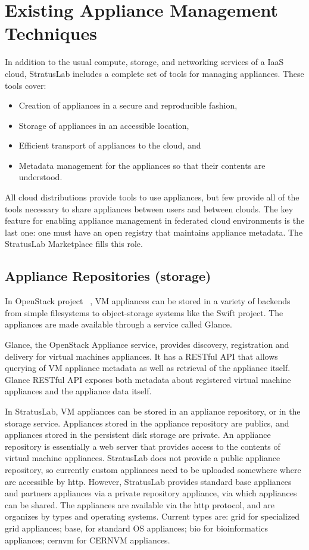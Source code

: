 \section{Existing Appliance Management Techniques}
\label{sec:other-approaches}

In addition to the usual compute, storage, and networking services of
a IaaS cloud, StratusLab includes a complete set of tools for managing
appliances.  These tools cover:
\begin{itemize}
\item Creation of appliances in a secure and reproducible fashion,
\item Storage of appliances in an accessible location,
\item Efficient transport of appliances to the cloud,
  and
\item Metadata management for the appliances so that their contents
  are understood.
\end{itemize}
All cloud distributions provide tools to use appliances, but few
provide all of the tools necessary to share appliances between users
and between clouds.  The key feature for enabling appliance management
in federated cloud environments is the last one: one must have an open
registry that maintains appliance metadata.  The StratusLab
Marketplace fills this role.

\subsection{Appliance Repositories (storage)}

In OpenStack project ~\cite{openstack}, VM appliances can be stored in a variety of
backends from simple filesystems to object-storage systems like the
Swift project. The appliances are made available through a service
called Glance.

Glance, the OpenStack Appliance service, provides discovery,
registration and delivery for virtual machines appliances. It has a
RESTful API that allows querying of VM appliance metadata as well as
retrieval of the appliance itself.  Glance RESTful API exposes both
metadata about registered virtual machine appliances and the appliance
data itself.

In StratusLab, VM appliances can be stored in an appliance repository,
or in the storage service. Appliances stored in the appliance
repository are publics, and appliances stored in the persistent disk
storage are private.  An appliance repository is essentially a web
server that provides access to the contents of virtual machine
appliances. StratusLab does not provide a public appliance repository,
so currently custom appliances need to be uploaded somewhere where are
accessible by http. However, StratusLab provides standard base
appliances and partners appliances via a private repository appliance,
via which appliances can be shared. The appliances are available via
the http protocol, and are organizes by types and operating systems.
Current types are: grid for specialized grid appliances; base, for
standard OS appliances; bio for bioinformatics appliances; cernvm for
CERNVM appliances.

